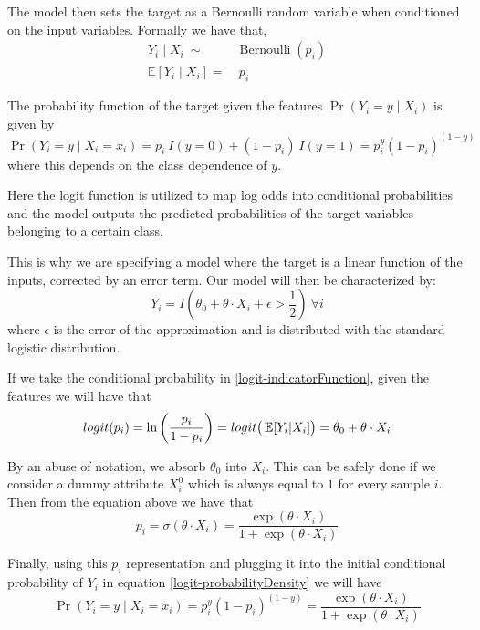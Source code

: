 The model then sets the target as a Bernoulli random variable when conditioned on the input variables.
Formally we have that,
\begin{equation}
\begin{split}
Y_i \mid X_i \ \sim & \operatorname{Bernoulli}(p_i) \\
\mathbb{E}[Y_i \mid X_i ] = & \ p_i
\end{split}
\end{equation}


The probability function of the target given the features $\Pr(Y_i=y\mid X_i)$ is given by
\begin{equation}\label{logit-probabilityDensity}
\Pr(Y_i=y \mid X_i = x_i) = p_i \ I(y=0) + (1-p_i) \ I(y=1) = p_i^{y} {(1-p_i)}^{(1-y)}
\end{equation}
where this depends on the class dependence of $y$.

Here the logit function is utilized to map log odds into conditional probabilities and the model outputs the predicted probabilities of the target variables belonging to a certain class.

This is why we are specifying a model where the target is a linear function of the inputs, corrected by an error term.
Our model will then be characterized by:
\begin{equation}\label{logit-indicatorFunction}
Y_i = I(\theta_0 + \theta \cdot X_i + \epsilon > \frac{1}{2}) \ \forall i
\end{equation}
where $\epsilon$ is the error of the approximation and is distributed with the standard logistic distribution.

If we take the conditional probability in \cref{logit-indicatorFunction}, given the features we will have that
\begin{equation}
logit(p_i)= \ln \left(\frac{p_i}{1-p_i} \right) = logit\big( \operatorname{\mathbb{E}}[Y_i| X_i] \big) = \theta_0 + \theta \cdot X_i
\end{equation}

By an abuse of notation, we absorb $\theta_0$ into $X_i$.
This can be safely done if we consider a dummy attribute $X_i^0$ which is always equal to $1$ for every sample $i$.
Then from the equation above we have that
\begin{equation}
p_i = \sigma(\theta \cdot X_i) = \frac{\exp(\theta \cdot X_i) }{1 + \exp(\theta \cdot X_i)}
\end{equation}

Finally, using this $p_i$ representation and plugging it into the initial conditional probability of $Y_i$ in equation \cref{logit-probabilityDensity} we will have
\begin{equation}
 \Pr(Y_i=y \mid X_i = x_i) = p_i^{y} {(1-p_i)}^{(1-y)} = \frac{\exp(\theta \cdot X_i) }{1 + \exp(\theta \cdot X_i)}
 \end{equation}


